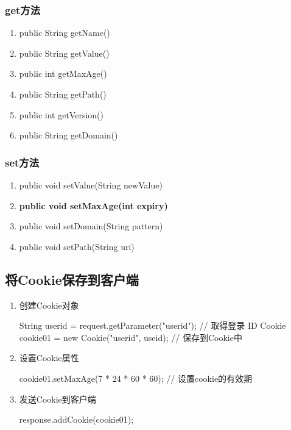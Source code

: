 \subsubsection{get方法}

\begin{enumerate}
\item public String getName()
\item public String getValue()
\item public int getMaxAge()
\item public String getPath()
\item public int getVersion()
\item public String getDomain()
\end{enumerate}

\subsubsection{set方法}
\begin{enumerate}
\item public void setValue(String newValue)
\item {\Blue\bf public void setMaxAge(int expiry)}
\item public void setDomain(String pattern)
\item public void setPath(String uri)
\end{enumerate}

\subsection{将Cookie保存到客户端}

\begin{enumerate}
\item 创建Cookie对象
  \begin{javaCode}
    String userid = request.getParameter("userid"); // 取得登录 ID
    Cookie cookie01 = new Cookie("userid", useid); // 保存到Cookie中
  \end{javaCode}

\item 设置Cookie属性
  \begin{javaCode}
    cookie01.setMaxAge(7 * 24 * 60 * 60); // 设置cookie的有效期
  \end{javaCode}

\item 发送Cookie到客户端
  \begin{javaCode}
    response.addCookie(cookie01);
  \end{javaCode}
\end{enumerate}

